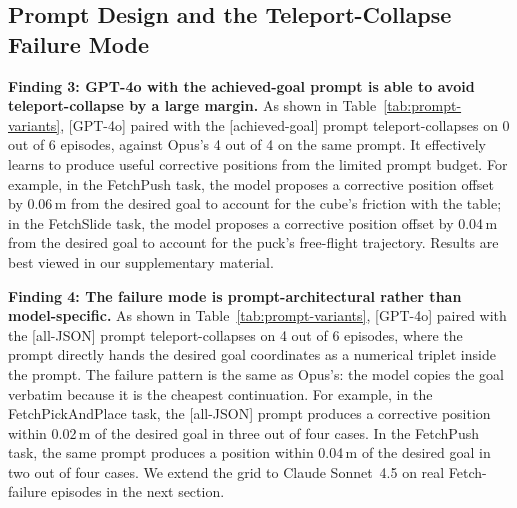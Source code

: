 \documentclass{article}
\begin{document}
\subsection{Prompt Design and the Teleport-Collapse Failure Mode}
\label{sec:exp:prompt}

\textbf{Finding 3: GPT-4o with the achieved-goal prompt is able to
avoid teleport-collapse by a large margin.}
As shown in Table~\ref{tab:prompt-variants}, [GPT-4o] paired with
the [achieved-goal] prompt teleport-collapses on 0 out of 6
episodes, against Opus's 4 out of 4 on the same prompt. It
effectively learns to produce useful corrective positions from the
limited prompt budget. For example, in the FetchPush task, the
model proposes a corrective position offset by 0.06\,m from the
desired goal to account for the cube's friction with the table; in
the FetchSlide task, the model proposes a corrective position
offset by 0.04\,m from the desired goal to account for the puck's
free-flight trajectory. Results are best viewed in our
supplementary material.

\textbf{Finding 4: The failure mode is prompt-architectural rather
than model-specific.}
As shown in Table~\ref{tab:prompt-variants}, [GPT-4o] paired with
the [all-JSON] prompt teleport-collapses on 4 out of 6 episodes,
where the prompt directly hands the desired goal coordinates as a
numerical triplet inside the prompt. The failure pattern is the
same as Opus's: the model copies the goal verbatim because it is
the cheapest continuation. For example, in the FetchPickAndPlace
task, the [all-JSON] prompt produces a corrective position within
0.02\,m of the desired goal in three out of four cases. In the
FetchPush task, the same prompt produces a position within 0.04\,m
of the desired goal in two out of four cases. We extend the grid
to Claude Sonnet~4.5 on real Fetch-failure episodes in the next
section.
\end{document}
